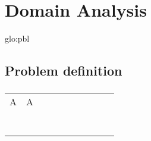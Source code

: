 \chapter{Domain Analysis}

\lipsum[1]
\acrshort{glo:pbl}

\section{Problem definition} \cite{bib:pbl}

\lipsum[2]

\subsection{}

\lipsum[5]




\begin{table}[H]
\begin{tabular}{llllllllll}
                 A & A  &  &  &  &  &  &  &  &  \\
                  &  &  &  &  &  &  &  &  &  \\
                  &  &  &  &  &  &  &  &  &  \\
                  &  &  &  &  &  &  &  &  &  \\
                  &  &  &  &  &  &  &  &  &  \\
                  &  &  &  &  &  &  &  &  &  \\
                  &  &  &  &  &  &  &  &  &  \\
                  &  &  &  &  &  &  &  &  & 
\end{tabular}
\end{table}
\cite{bib:pbl}
